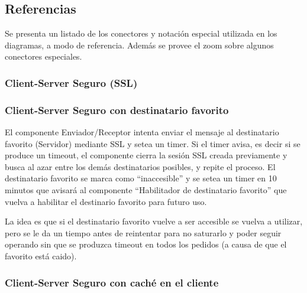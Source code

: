 \subsection{Referencias}

Se presenta un listado de los conectores y notación especial utilizada en los diagramas, a modo de referencia. Además se provee el zoom sobre algunos conectores especiales.


\subsubsection{Client-Server Seguro (SSL)}




\subsubsection{Client-Server Seguro con destinatario favorito}


El componente Enviador/Receptor intenta enviar el mensaje
al destinatario favorito (Servidor) mediante SSL y setea un timer.
Si el timer avisa, es decir si se produce un timeout, el componente
cierra la sesión SSL creada previamente y busca al azar entre los
demás destinatarios posibles, y repite el proceso. El destinatario
favorito se marca como ``inaccesible'' y se setea un timer en 10
minutos que avisará al componente ``Habilitador de destinatario
favorito'' que vuelva a habilitar el destinario favorito para
futuro uso.

La idea es que si el destinatario favorito vuelve a ser accesible se
vuelva a utilizar, pero se le da un tiempo antes de reintentar para
no saturarlo y poder seguir operando sin que se produzca timeout
en todos los pedidos (a causa de que el favorito está caido).

\subsubsection{Client-Server Seguro con caché en el cliente}


